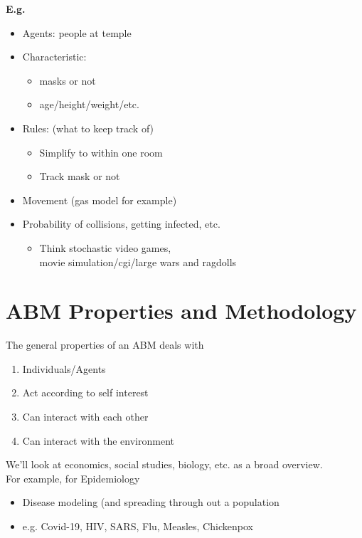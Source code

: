 \documentclass[12pt]{book}
\begin{document}
\noindent \textbf{E.g.}
\begin{itemize}
	\item Agents: people at temple
	\item Characteristic: 

	\begin{itemize}
		\item masks or not
		\item age/height/weight/etc.
	\end{itemize}
	\item Rules: (what to keep track of)

	\begin{itemize}
		\item Simplify to within one room
		\item Track mask or not
	\end{itemize}

	\item Movement (gas model for example)
	\item Probability of collisions, getting infected, etc.
	\begin{itemize}
		\item Think stochastic video games, \\movie simulation/cgi/large wars and ragdolls
	\end{itemize}
\end{itemize}



\section{ABM Properties and Methodology}
\noindent The general properties of an ABM deals with
\begin{enumerate}
	\item Individuals/Agents
	\item Act according to self interest
	\item Can interact with each other
	\item Can interact with the environment
\end{enumerate}

We'll look at economics, social studies, biology, etc. as a broad overview.\\

\newpage
\noindent For example, for Epidemiology
\begin{itemize}
\item Disease modeling (and spreading through out a population
	\item e.g. Covid-19, HIV, SARS, Flu, Measles, Chickenpox
\end{itemize}
\end{document}
